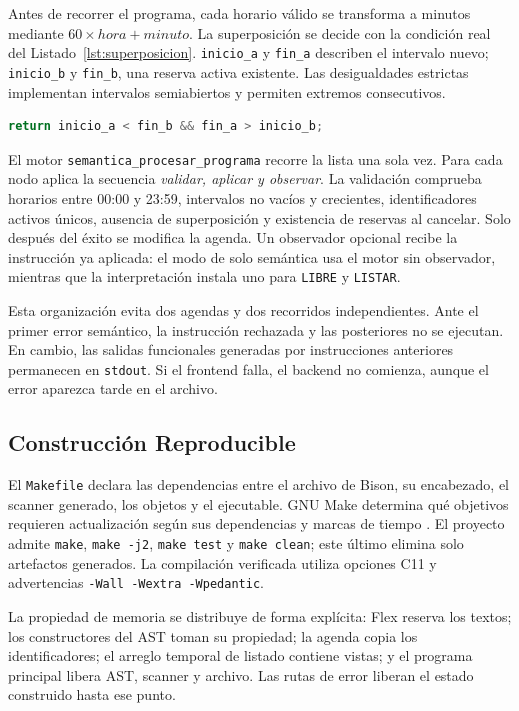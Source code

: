 \documentclass[runningheads]{llncs}
\begin{document}
Antes de recorrer el programa, cada horario válido se transforma a minutos
mediante $60 \times hora + minuto$. La superposición se decide con la condición
real del Listado~\ref{lst:superposicion}. \texttt{inicio\_a} y
\texttt{fin\_a} describen el intervalo nuevo; \texttt{inicio\_b} y
\texttt{fin\_b}, una reserva activa existente. Las desigualdades estrictas
implementan intervalos semiabiertos y permiten extremos consecutivos.

\begin{lstlisting}[language=C,caption={Condición implementada para detectar superposición.},label={lst:superposicion}]
return inicio_a < fin_b && fin_a > inicio_b;
\end{lstlisting}

El motor \texttt{semantica\_procesar\_programa} recorre la lista una sola vez.
Para cada nodo aplica la secuencia \emph{validar, aplicar y observar}. La
validación comprueba horarios entre 00:00 y 23:59, intervalos no vacíos y
crecientes, identificadores activos únicos, ausencia de superposición y
existencia de reservas al cancelar. Solo después del éxito se modifica la
agenda. Un observador opcional recibe la instrucción ya aplicada: el modo de
solo semántica usa el motor sin observador, mientras que la interpretación
instala uno para \texttt{LIBRE} y \texttt{LISTAR}.

Esta organización evita dos agendas y dos recorridos independientes. Ante el
primer error semántico, la instrucción rechazada y las posteriores no se
ejecutan. En cambio, las salidas funcionales generadas por instrucciones
anteriores permanecen en \texttt{stdout}. Si el frontend falla, el backend no
comienza, aunque el error aparezca tarde en el archivo.

\subsection{Construcción Reproducible}

El \texttt{Makefile} declara las dependencias entre el archivo de Bison, su
encabezado, el scanner generado, los objetos y el ejecutable. GNU Make determina
qué objetivos requieren actualización según sus dependencias y marcas de
tiempo \cite{make2023}. El proyecto admite \texttt{make}, \texttt{make -j2},
\texttt{make test} y \texttt{make clean}; este último elimina solo artefactos
generados. La compilación verificada utiliza opciones C11 y advertencias
\texttt{-Wall -Wextra -Wpedantic}.

La propiedad de memoria se distribuye de forma explícita: Flex reserva los
textos; los constructores del AST toman su propiedad; la agenda copia los
identificadores; el arreglo temporal de listado contiene vistas; y el programa
principal libera AST, scanner y archivo. Las rutas de error liberan el estado
construido hasta ese punto.
\end{document}

